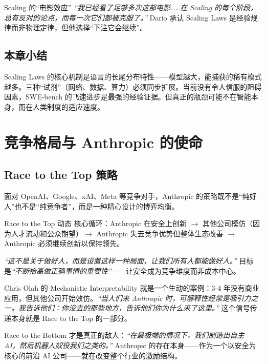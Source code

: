 \documentclass[a4paper]{article}
\begin{document}
\begin{importantbox}{Scaling 的``电影效应''}
\textit{``我已经看了足够多次这部电影……在 Scaling 的每个阶段，总有反对的论点，而每一次它们都被克服了。''} Dario 承认 Scaling Laws 是经验规律而非物理定律，但他选择``下注它会继续''。
\end{importantbox}

\subsection{本章小结}

Scaling Laws 的核心机制是语言的长尾分布特性——模型越大，能捕获的稀有模式越多。三种``试剂''（网络、数据、算力）必须同步扩展。当前没有令人信服的阻碍因素，SWE-bench 的飞速进步是最强的经验证据。但真正的瓶颈可能不在智能本身，而在人类制度的适应速度。

\section{竞争格局与 Anthropic 的使命}

\subsection{Race to the Top 策略}

面对 OpenAI、Google、xAI、Meta 等竞争对手，Anthropic 的策略既不是``纯好人''也不是``纯竞争者''，而是一种精心设计的博弈均衡。

\begin{importantbox}{Race to the Top 动态}
核心循环：Anthropic 在安全上创新 $\to$ 其他公司模仿（因为人才流动和公众期望）$\to$ Anthropic 失去竞争优势但整体生态改善 $\to$ Anthropic 必须继续创新以保持领先。

\textit{``这不是关于做好人，而是设置这样一种局面，让我们所有人都能做好人。''} 目标是\textit{``不断抬高做正确事情的重要性''}——让安全成为竞争维度而非成本中心。

Chris Olah 的 Mechanistic Interpretability 就是一个生动的案例：3-4 年没有商业应用，但其他公司开始效仿。\textit{``当人们来 Anthropic 时，可解释性经常是吸引力之一。我告诉他们：你没去的那些地方，告诉他们你为什么来了这里。''} 这个信号传递本身就是 Race to the Top 的一部分。
\end{importantbox}

Race to the Bottom 才是真正的敌人：\textit{``在最极端的情况下，我们制造出自主 AI，然后机器人奴役我们之类的。''} Anthropic 的存在本身——作为一个以安全为核心的前沿 AI 公司——就在改变整个行业的激励结构。
\end{document}
